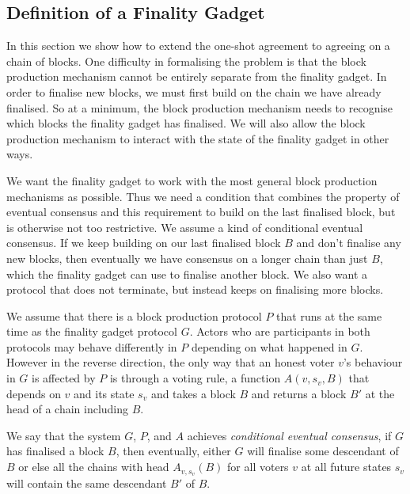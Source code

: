 \documentclass{article}
\begin{document}
\subsection{Definition of a Finality Gadget}

In this section we show how to extend the one-shot agreement to agreeing on a chain of blocks. One difficulty in formalising the problem is that the block production mechanism cannot be entirely separate from the finality gadget. In order to finalise new blocks, we must first build on the chain we have already finalised. So at a minimum, the block production mechanism needs to recognise which blocks the finality gadget has finalised. We will also allow the block production mechanism to interact with the state of the finality gadget in other ways.

We want the finality gadget to work with the most general block production mechanisms as possible. Thus we need a condition that combines the property of eventual consensus and this requirement to build on the last finalised block, but is otherwise not too restrictive.
We assume a kind of conditional eventual consensus.
If we keep building on our last finalised block $B$ and don't finalise any new blocks, then eventually we have consensus on a longer chain than just $B$, which the finality gadget can use to finalise another block.
We also want a protocol that does not terminate, but instead keeps on finalising more blocks. 

We assume that there is a block production protocol $P$ that runs at the same time as the finality gadget protocol $G$. Actors who are participants in both protocols may behave differently in $P$ depending on what happened in $G$.
However in the reverse direction, the only way that an honest voter $v$'s behaviour in $G$ is affected by $P$ is through a voting rule, a function $A(v,s_v,B)$ that depends on $v$ and its state $s_v$ and takes a block $B$ and returns a block $B'$ at the head of a chain including $B$.

We say that the system $G$, $P$, and $A$ achieves {\em conditional eventual consensus}, if $G$ has finalised a block $B$, then eventually, either $G$ will finalise some descendant of $B$ or else all the chains with head $A_{v,s_v}(B)$ for all voters $v$ at all future states $s_v$ will contain the same descendant $B'$ of $B$.
\end{document}

